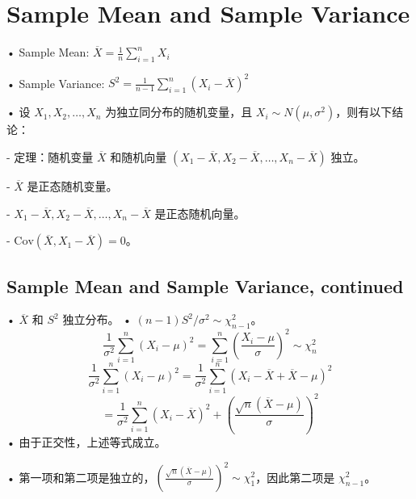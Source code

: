 \documentclass[UTF8]{report}
\theoremstyle{MyLineTheoremStyle} %
\theoremstyle{MyBlockTheoremStyle} %
\theoremstyle{MySubsubsectionStyle} %
\begin{document}
\section{Sample Mean and Sample Variance}
• Sample Mean: $\overline{X} = \frac{1}{n} \sum_{i=1}^{n} X_i$\par
• Sample Variance: $S^2 = \frac{1}{n-1} \sum_{i=1}^{n} (X_i - \overline{X})^2$\par
• 设 $X_1, X_2, \ldots, X_n$ 为独立同分布的随机变量，且 $X_i \sim N(\mu, \sigma^2)$，则有以下结论：\par
  - 定理：随机变量 $\overline{X}$ 和随机向量 $(X_1 - \overline{X}, X_2 - \overline{X}, \ldots, X_n - \overline{X})$ 独立。\par
  - $\overline{X}$ 是正态随机变量。\par
  - $X_1 - \overline{X}, X_2 - \overline{X}, \ldots, X_n - \overline{X}$ 是正态随机向量。\par
  - $\text{Cov}(\overline{X}, X_1 - \overline{X}) = 0$。

\subsection{Sample Mean and Sample Variance, continued}
• $\overline{X}$ 和 $S^2$ 独立分布。
• $(n-1)S^2/\sigma^2 \sim \chi^2_{n-1}$。
\[
\frac{1}{\sigma^2} \sum_{i=1}^{n} (X_i - \mu)^2 = \sum_{i=1}^{n} \left(\frac{X_i - \mu}{\sigma}\right)^2 \sim \chi^2_n
\]
\[
\frac{1}{\sigma^2} \sum_{i=1}^{n} (X_i - \mu)^2 = \frac{1}{\sigma^2} \sum_{i=1}^{n} (X_i - \overline{X} + \overline{X} - \mu)^2
\]
\[
= \frac{1}{\sigma^2} \sum_{i=1}^{n} (X_i - \overline{X})^2 + \left(\frac{\sqrt{n} (\overline{X} - \mu)}{\sigma}\right)^2
\]
• 由于正交性，上述等式成立。\par
• 第一项和第二项是独立的，$\left(\frac{\sqrt{n} (\overline{X} - \mu)}{\sigma}\right)^2 \sim \chi^2_1$，因此第二项是 $\chi^2_{n-1}$。

%
\end{document}
